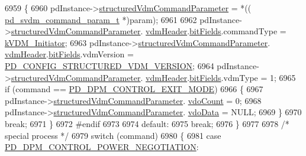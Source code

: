 \begin{DoxyCode}
6959         \{
6960             pdInstance->\hyperlink{struct__pd__instance_a37746abee0ebb0169f8a1e7227d8645b}{structuredVdmCommandParameter} = *((
      \hyperlink{struct__pd__svdm__param}{pd\_svdm\_command\_param\_t} *)param);
6961 
6962             pdInstance->\hyperlink{struct__pd__instance_a37746abee0ebb0169f8a1e7227d8645b}{structuredVdmCommandParameter}.
      \hyperlink{struct__pd__svdm__param_aaebc50d834d15e862f264a4e4d8421b4}{vdmHeader}.\hyperlink{struct__pd__structured__vdm__header_afc8471a70fa430820836286de3cf2281}{bitFields}.commandType = \hyperlink{group__usb__pd__stack_ggaa6b2f8f6620280d0d17ab102c5992ca8a0081a7547bb0feb88cd34c46cc1e9146}{kVDM\_Initiator};
6963             pdInstance->\hyperlink{struct__pd__instance_a37746abee0ebb0169f8a1e7227d8645b}{structuredVdmCommandParameter}.
      \hyperlink{struct__pd__svdm__param_aaebc50d834d15e862f264a4e4d8421b4}{vdmHeader}.\hyperlink{struct__pd__structured__vdm__header_afc8471a70fa430820836286de3cf2281}{bitFields}.vdmVersion = 
      \hyperlink{usb__pd__config_8h_a365eed8791b0798547575ea313bc8977}{PD\_CONFIG\_STRUCTURED\_VDM\_VERSION};
6964             pdInstance->\hyperlink{struct__pd__instance_a37746abee0ebb0169f8a1e7227d8645b}{structuredVdmCommandParameter}.
      \hyperlink{struct__pd__svdm__param_aaebc50d834d15e862f264a4e4d8421b4}{vdmHeader}.\hyperlink{struct__pd__structured__vdm__header_afc8471a70fa430820836286de3cf2281}{bitFields}.vdmType = 1;
6965             \textcolor{keywordflow}{if} (command == \hyperlink{group__usb__pd__stack_ggabf2676c3360b7c572954ae09c0a5e46aa979f0d2508a56e60739866d338599f73}{PD\_DPM\_CONTROL\_EXIT\_MODE})
6966             \{
6967                 pdInstance->\hyperlink{struct__pd__instance_a37746abee0ebb0169f8a1e7227d8645b}{structuredVdmCommandParameter}.
      \hyperlink{struct__pd__svdm__param_a153be4aa8e8fa9e41ac83eb41e513060}{vdoCount} = 0;
6968                 pdInstance->\hyperlink{struct__pd__instance_a37746abee0ebb0169f8a1e7227d8645b}{structuredVdmCommandParameter}.
      \hyperlink{struct__pd__svdm__param_a1da6696ea0b07e0173cc469094639e99}{vdoData} = NULL;
6969             \}
6970             \textcolor{keywordflow}{break};
6971         \}
6972 \textcolor{preprocessor}{#endif
}
6973 \textcolor{preprocessor}{}
6974         \textcolor{keywordflow}{default}:
6975             \textcolor{keywordflow}{break};
6976     \}
6977 
6978     \textcolor{comment}{/* special process */}
6979     \textcolor{keywordflow}{switch} (command)
6980     \{
6981         \textcolor{keywordflow}{case} \hyperlink{group__usb__pd__stack_ggabf2676c3360b7c572954ae09c0a5e46aa30530dc299e85a527d236c16e68bff36}{PD\_DPM\_CONTROL\_POWER\_NEGOTIATION}:

\end{DoxyCode}
